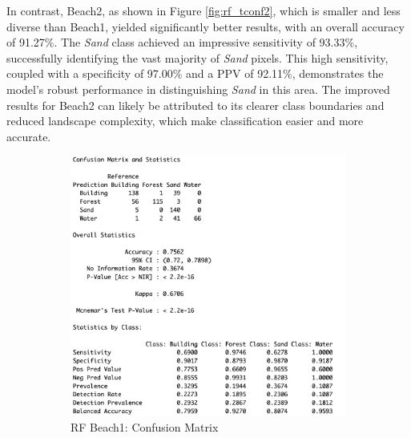 \documentclass[a4paper,12pt]{article}
\begin{document}
In contrast, Beach2, as shown in Figure \ref{fig:rf_tconf2}, which is smaller and less diverse than Beach1, yielded significantly better results, with an overall accuracy of 91.27\%. The \textit{Sand} class achieved an impressive sensitivity of 93.33\%, successfully identifying the vast majority of \textit{Sand} pixels. This high sensitivity, coupled with a specificity of 97.00\% and a PPV of 92.11\%, demonstrates the model's robust performance in distinguishing \textit{Sand} in this area. The improved results for Beach2 can likely be attributed to its clearer class boundaries and reduced landscape complexity, which make classification easier and more accurate.

\begin{figure}[H]
    \centering
    \begin{subfigure}[b]{0.48\linewidth} %
        \centering
        \includegraphics[width=\linewidth]{Random_Forest_Model/Random ForestBeach1 Confusionmatrix.png}
        \caption{RF Beach1: Confusion Matrix}
        \label{fig:rf_conf1}
    \end{subfigure}
    \hspace{0.02\linewidth} %
    \begin{subfigure}[b]{0.48\linewidth}
        \centering

\end{subfigure}
\end{figure}
\end{document}
